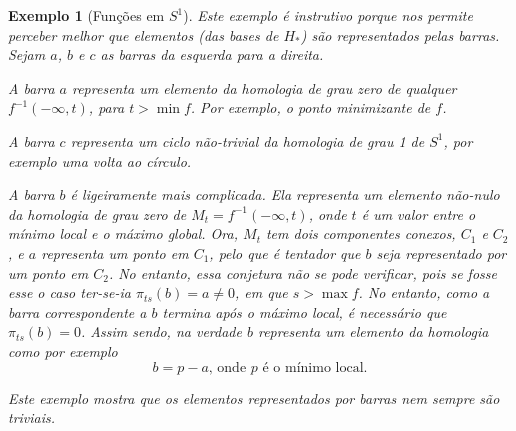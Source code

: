 \documentclass[11pt]{article}
\newtheorem{ex}{Exemplo}
\theoremstyle{nonumberplain}
\begin{document}
\begin{ex}[Funções em $S^1$]
Este exemplo é instrutivo porque nos permite perceber melhor que elementos (das bases de $H_*$) são representados pelas barras. Sejam $a$, $b$ e $c$ as barras da esquerda para a direita.

A barra $a$ representa um elemento da homologia de grau zero de qualquer $f^{-1}(-\infty, t)$, para $t > \min f$. Por exemplo, o ponto minimizante de $f$.

A barra $c$ representa um ciclo não-trivial da homologia de grau 1 de $S^1$, por exemplo uma volta ao círculo.

A barra $b$ é ligeiramente mais complicada. Ela representa um elemento não-nulo da homologia de grau zero de $M_t = f^{-1}(-\infty, t)$, onde $t$ é um valor entre o mínimo local e o máximo global. Ora, $M_t$ tem dois componentes conexos, $C_1$ e $C_2$, e $a$ representa um ponto em $C_1$, pelo que é tentador que $b$ seja representado por um ponto em $C_2$. No entanto, essa conjetura não se pode verificar, pois se fosse esse o caso ter-se-ia $\pi_{ts}(b) = a \neq 0$, em que $s > \max f$. No entanto, como a barra correspondente a $b$ termina após o máximo local, é necessário que $\pi_{ts}(b) = 0$. Assim sendo, na verdade $b$ representa um elemento da homologia como por exemplo
\[ b = p - a \text{, onde $p$ é o mínimo local.}\]

Este exemplo mostra que os elementos representados por barras nem sempre são triviais.
\end{ex}

\nocite{polterovich}



\end{document}
